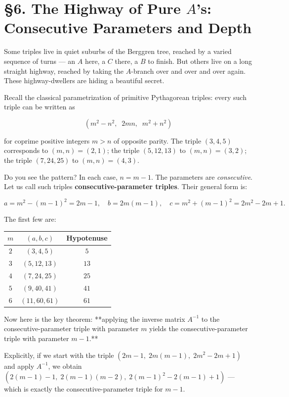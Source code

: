 \documentclass[12pt, letterpaper, openany]{book}
\theoremstyle{definition}
\theoremstyle{remark}
\begin{document}
\section*{§6. The Highway of Pure $A$'s: Consecutive Parameters and Depth}


Some triples live in quiet suburbs of the Berggren tree, reached by a varied sequence of turns --- an $A$ here, a $C$ there, a $B$ to finish. But others live on a long straight highway, reached by taking the $A$-branch over and over and over again. These highway-dwellers are hiding a beautiful secret.

Recall the classical parametrization of primitive Pythagorean triples: every such triple can be written as

\[
(m^2 - n^2,\;\; 2mn,\;\; m^2 + n^2)
\]

for coprime positive integers $m > n$ of opposite parity. The triple $(3, 4, 5)$ corresponds to $(m, n) = (2, 1)$; the triple $(5, 12, 13)$ to $(m, n) = (3, 2)$; the triple $(7, 24, 25)$ to $(m, n) = (4, 3)$.

Do you see the pattern? In each case, $n = m - 1$. The parameters are \textit{consecutive}. Let us call such triples \textbf{consecutive-parameter triples}. Their general form is:

\[
a = m^2 - (m-1)^2 = 2m - 1, \quad b = 2m(m-1), \quad c = m^2 + (m-1)^2 = 2m^2 - 2m + 1.
\]

The first few are:


\begin{center}
\begin{tabular}{|c|c|c|}
\hline
$m$ & $(a, b, c)$ & Hypotenuse \\
\hline
$2$ & $(3, 4, 5)$ & $5$ \\
$3$ & $(5, 12, 13)$ & $13$ \\
$4$ & $(7, 24, 25)$ & $25$ \\
$5$ & $(9, 40, 41)$ & $41$ \\
$6$ & $(11, 60, 61)$ & $61$ \\
\hline
\end{tabular}
\end{center}


Now here is the key theorem: **applying the inverse matrix $A^{-1}$ to the consecutive-parameter triple with parameter $m$ yields the consecutive-parameter triple with parameter $m - 1$.**

Explicitly, if we start with the triple $(2m - 1,\; 2m(m-1),\; 2m^2 - 2m + 1)$ and apply $A^{-1}$, we obtain $(2(m-1) - 1,\; 2(m-1)(m-2),\; 2(m-1)^2 - 2(m-1) + 1)$ --- which is exactly the consecutive-parameter triple for $m - 1$.
\end{document}
